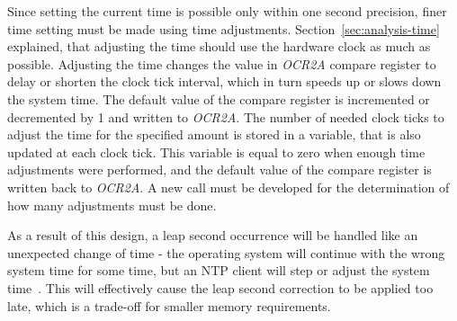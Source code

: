 Since setting the current time is possible only within one second precision,
finer time setting must be made using time adjustments.
Section~\ref{sec:analysis-time} explained, that adjusting the time
should use the hardware clock as much as possible.
Adjusting the time changes the value in {\it{OCR2A}} compare register
to delay or shorten the clock tick interval,
which in turn speeds up or slows down the system time.
The default value of the compare register is incremented or decremented by 1
and written to {\it{OCR2A}}.
The number of needed clock ticks to adjust the time for the specified amount
is stored in a variable, that is also updated at each clock tick.
This variable is equal to zero when enough time adjustments were performed,
and the default value of the compare register is written back to {\it{OCR2A}}.
A new call must be developed for the determination of how many adjustments must be done.

As a result of this design, a leap second occurrence will be handled like an unexpected change of time -
the operating system will continue with the wrong system time for some time,
but an NTP client will step or adjust the system time~\cite{ntp-faq}.
This will effectively cause the leap second correction to be applied too late,
which is a trade-off for smaller memory requirements.


